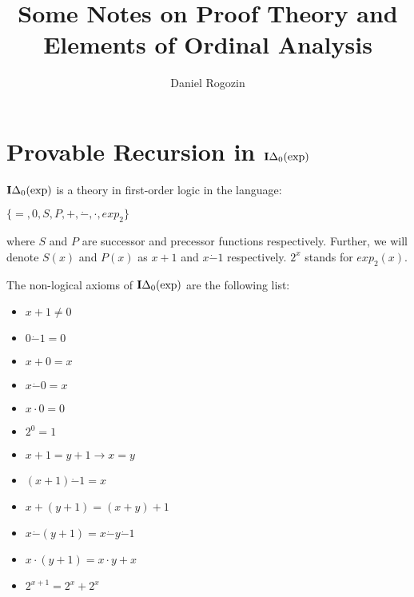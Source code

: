 \documentclass[8pt]{article}
\title{Some Notes on Proof Theory and Elements of Ordinal Analysis}
\author{Daniel Rogozin}
\date{ }
\theoremstyle{definition}
\theoremstyle{definition}
\theoremstyle{definition}
\theoremstyle{definition}
\theoremstyle{definition}
\theoremstyle{definition}
\theoremstyle{definition}
\theoremstyle{definition}
\theoremstyle{definition}
\theoremstyle{definition}
\theoremstyle{definition}
\theoremstyle{definition}
\theoremstyle{definition}
\theoremstyle{question}
\begin{document}
\maketitle

\section{Provable Recursion in ${\bf I}\Delta_0(\operatorname{exp})$}

${\bf I}\Delta_0(\operatorname{exp})$ is a theory in first-order logic in the language:
\begin{center}
  $\{ =, 0, S, P, +, \dot{-}, \cdot, exp_2 \}$
\end{center}
where $S$ and $P$ are successor and precessor functions respectively.
Further, we will denote $S(x)$ and $P(x)$ as $x + 1$ and $x \dot{-} 1$ respectively.
$2^x$ stands for $exp_2(x)$.

The non-logical axioms of ${\bf I}\Delta_0(\operatorname{exp})$ are the following list:

\vspace{\baselineskip}

\begin{minipage}{0.45\textwidth}
  \begin{itemize}
    \item $x + 1 \neq 0$
    \item $0 \dot{-} 1 = 0$
    \item $x + 0 = x$
    \item $x \dot{-} 0 = x$
    \item $x \cdot 0 = 0$
    \item $2^0 = 1$
  \end{itemize}
\end{minipage}%
\hfill
\begin{minipage}{0.45\textwidth}
  \begin{itemize}
    \item $x + 1 = y + 1 \to x = y$
    \item $(x + 1) \dot{-} 1 = x$
    \item $x + (y + 1) = (x + y) + 1$
    \item $x \dot{-} (y + 1) = x \dot{-} y \dot{-} 1$
    \item $x \cdot (y + 1) = x \cdot y + x$
    \item $2^{x + 1} = 2^x + 2^x$
  \end{itemize}
\end{minipage}

\vspace{\baselineskip}
\end{document}
